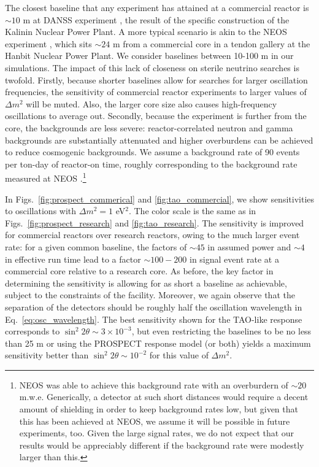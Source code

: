 \documentclass[prd, twocolumn, tightenlines, twoside, secnumarabic, superscriptaddress, preprintnumbers, nofootinbib, notitlepage]{revtex4-1}
\begin{document}
The closest baseline that any experiment has attained at a commercial reactor is $\sim 10$ m at DANSS experiment \cite{Danilov:2019aef}, the result of the specific construction of the Kalinin Nuclear Power Plant. A more typical scenario is akin to the NEOS experiment \cite{NEOS:2016wee}, which sits $\sim24$ m from a commercial core in a tendon gallery at the Hanbit Nuclear Power Plant. We consider baselines between 10-100 m in our simulations. The impact of this lack of closeness on sterile neutrino searches is twofold. Firstly, because shorter baselines allow for searches for larger oscillation frequencies, the sensitivity of commercial reactor experiments to larger values of $\Delta m^2$ will be muted. Also, the larger core size also causes high-frequency oscillations to average out.  Secondly, because the experiment is further from the core, the backgrounds are less severe: reactor-correlated neutron and gamma backgrounds are substantially attenuated and higher overburdens can be achieved to reduce cosmogenic backgrounds. We assume a background rate of 90 events per ton-day of reactor-on time, roughly corresponding to the background rate measured at NEOS \cite{NEOS:2016wee}.\footnote{NEOS was able to achieve this background rate with an overburdern of $\sim20$ m.w.e. Generically, a detector at such short distances would require a decent amount of shielding in order to keep background rates low, but given that this has been achieved at NEOS, we assume it will be possible in future experiments, too. Given the large signal rates, we do not expect that our results would be appreciably different if the background rate were modestly larger than this.}

In Figs.~\ref{fig:prospect_commerical} and \ref{fig:tao_commercial}, we show sensitivities to oscillations with $\Delta m^2 = 1$ eV$^2$. The color scale is the same as in Figs.~\ref{fig:prospect_research} and \ref{fig:tao_research}. The sensitivity is improved for commercial reactors over research reactors, owing to the much larger event rate: for a given common baseline, the factors of $\sim45$ in assumed power and $\sim4$ in effective run time lead to a factor $\sim100-200$ in signal event rate at a commercial core relative to a research core. As before, the key factor in determining the sensitivity is allowing for as short a baseline as achievable, subject to the constraints of the facility. Moreover, we again observe that the separation of the detectors should be roughly half the oscillation wavelength in Eq.~\eqref{eq:osc_wavelength}. The best sensitivity shown for the TAO-like response corresponds to $\sin^2 2\theta \sim 3 \times 10^{-3}$, but even restricting the baselines to be no less than 25 m or using the PROSPECT response model (or both) yields a maximum sensitivity better than $\sin^2 2\theta \sim 10^{-2}$ for this value of $\Delta m^2$.
\end{document}
